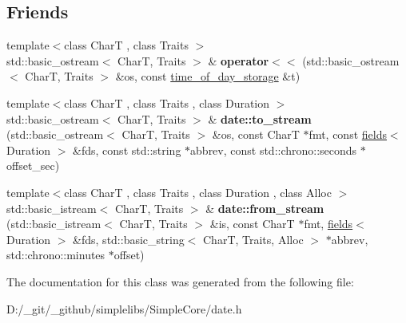 \subsection*{Friends}
\begin{DoxyCompactItemize}
\item 
\mbox{\label{classdate_1_1detail_1_1time__of__day__storage_3_01std_1_1chrono_1_1duration_3_01_rep_00_01_perioa4aafe6bf337ed7dabca38dd6be843a3_aa723ed987ab639045a035ce6020dfb3d}} 
{\footnotesize template$<$class CharT , class Traits $>$ }\\std\+::basic\+\_\+ostream$<$ CharT, Traits $>$ \& {\bfseries operator$<$$<$} (std\+::basic\+\_\+ostream$<$ CharT, Traits $>$ \&os, const \mbox{\hyperlink{classdate_1_1detail_1_1time__of__day__storage}{time\+\_\+of\+\_\+day\+\_\+storage}} \&t)
\item 
\mbox{\label{classdate_1_1detail_1_1time__of__day__storage_3_01std_1_1chrono_1_1duration_3_01_rep_00_01_perioa4aafe6bf337ed7dabca38dd6be843a3_af646bb7793065d736d7bc5d5af89c618}} 
{\footnotesize template$<$class CharT , class Traits , class Duration $>$ }\\std\+::basic\+\_\+ostream$<$ CharT, Traits $>$ \& {\bfseries date\+::to\+\_\+stream} (std\+::basic\+\_\+ostream$<$ CharT, Traits $>$ \&os, const CharT $\ast$fmt, const \mbox{\hyperlink{structdate_1_1fields}{fields}}$<$ Duration $>$ \&fds, const std\+::string $\ast$abbrev, const std\+::chrono\+::seconds $\ast$offset\+\_\+sec)
\item 
\mbox{\label{classdate_1_1detail_1_1time__of__day__storage_3_01std_1_1chrono_1_1duration_3_01_rep_00_01_perioa4aafe6bf337ed7dabca38dd6be843a3_a0c7fd4eb3b7ef95c2234b7d6c2000f66}} 
{\footnotesize template$<$class CharT , class Traits , class Duration , class Alloc $>$ }\\std\+::basic\+\_\+istream$<$ CharT, Traits $>$ \& {\bfseries date\+::from\+\_\+stream} (std\+::basic\+\_\+istream$<$ CharT, Traits $>$ \&is, const CharT $\ast$fmt, \mbox{\hyperlink{structdate_1_1fields}{fields}}$<$ Duration $>$ \&fds, std\+::basic\+\_\+string$<$ CharT, Traits, Alloc $>$ $\ast$abbrev, std\+::chrono\+::minutes $\ast$offset)
\end{DoxyCompactItemize}


The documentation for this class was generated from the following file\+:\begin{DoxyCompactItemize}
\item 
D\+:/\+\_\+git/\+\_\+github/simplelibs/\+Simple\+Core/date.\+h\end{DoxyCompactItemize}

